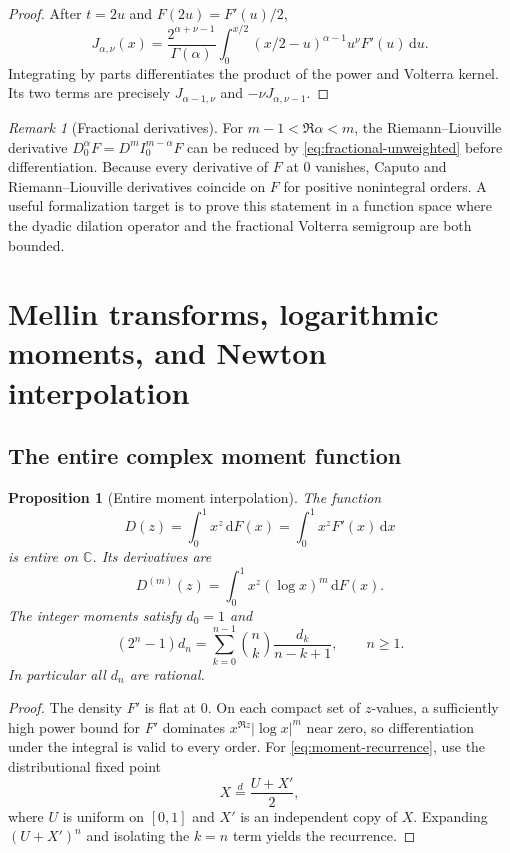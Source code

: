 \documentclass[11pt,oneside]{article}
\newtheorem{proposition}[theorem]{Proposition}
\theoremstyle{definition}
\theoremstyle{remark}
\newtheorem{remark}[theorem]{Remark}
\newcommand{\C}{\mathbb C}
\newcommand{\dd}{\,\mathrm d}
\begin{document}
\begin{proof}
After $t=2u$ and $F(2u)=F'(u)/2$,
\[
 J_{\alpha,\nu}(x)=\frac{2^{\alpha+\nu-1}}{\Gamma(\alpha)}
 \int_0^{x/2}(x/2-u)^{\alpha-1}u^\nu F'(u)\dd u.
\]
Integrating by parts differentiates the product of the power and Volterra kernel.  Its two terms are precisely $J_{\alpha-1,\nu}$ and $-\nu J_{\alpha,\nu-1}$.
\end{proof}

\begin{remark}[Fractional derivatives]
For $m-1<\Re\alpha<m$, the Riemann--Liouville derivative
$D_0^\alpha F=D^mI_0^{m-\alpha}F$ can be reduced by \eqref{eq:fractional-unweighted} before differentiation.  Because every derivative of $F$ at $0$ vanishes, Caputo and Riemann--Liouville derivatives coincide on $F$ for positive nonintegral orders.  A useful formalization target is to prove this statement in a function space where the dyadic dilation operator and the fractional Volterra semigroup are both bounded.
\end{remark}

\section{Mellin transforms, logarithmic moments, and Newton interpolation}

\subsection{The entire complex moment function}

\begin{proposition}[Entire moment interpolation]\label{prop:D-entire}
The function
\[
 D(z)=\int_0^1x^z\dd F(x)=\int_0^1x^zF'(x)\dd x
\]
is entire on $\C$.  Its derivatives are
\begin{equation}\label{eq:D-derivatives}
 D^{(m)}(z)=\int_0^1x^z(\log x)^m\dd F(x).
\end{equation}
The integer moments satisfy $d_0=1$ and
\begin{equation}\label{eq:moment-recurrence}
 (2^n-1)d_n=
 \sum_{k=0}^{n-1}\binom nk\frac{d_k}{n-k+1},
 \qquad n\ge1.
\end{equation}
In particular all $d_n$ are rational.
\end{proposition}

\begin{proof}
The density $F'$ is flat at $0$.  On each compact set of $z$-values, a sufficiently high power bound for $F'$ dominates $x^{\Re z}|\log x|^m$ near zero, so differentiation under the integral is valid to every order.  For \eqref{eq:moment-recurrence}, use the distributional fixed point
\[
 X\overset d=\frac{U+X'}2,
\]
where $U$ is uniform on $[0,1]$ and $X'$ is an independent copy of $X$.  Expanding $(U+X')^n$ and isolating the $k=n$ term yields the recurrence.
\end{proof}
\end{document}
